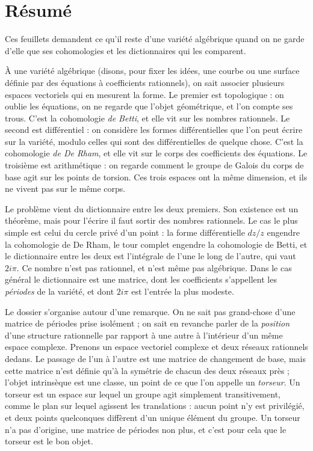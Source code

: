 \documentclass[11pt,a4paper]{article}
\begin{document}
\section*{Résumé}

\begin{resume}
Ces feuillets demandent ce qu'il reste d'une variété algébrique quand on ne
garde d'elle que ses cohomologies et les dictionnaires qui les comparent.

À une variété algébrique (disons, pour fixer les
idées, une courbe ou une surface définie par des équations à coefficients
rationnels), on sait associer plusieurs espaces vectoriels qui en mesurent la
forme. Le premier est topologique : on oublie les équations, on ne regarde que
l'objet géométrique, et l'on compte ses trous. C'est la cohomologie
\emph{de Betti}, et elle vit sur les nombres rationnels. Le second est
différentiel : on considère les formes différentielles que l'on peut écrire sur
la variété, modulo celles qui sont des différentielles de quelque chose. C'est
la cohomologie \emph{de De Rham}, et elle vit sur le corps des coefficients des
équations. Le troisième est arithmétique : on regarde comment le groupe de
Galois du corps de base agit sur les points de torsion. Ces trois espaces ont
la même dimension, et ils ne vivent pas sur le même corps.

Le problème vient du dictionnaire entre les deux premiers. Son existence est
un théorème, mais pour l'écrire il faut sortir des nombres rationnels. Le cas
le plus simple est celui du cercle privé d'un point : la forme différentielle
$dz/z$ engendre la cohomologie de De Rham, le tour complet engendre la
cohomologie de Betti, et le dictionnaire entre les deux est l'intégrale de
l'une le long de l'autre, qui vaut $2i\pi$. Ce nombre n'est pas rationnel, et
n'est même pas algébrique. Dans le cas général le dictionnaire est une matrice,
dont les coefficients s'appellent les \emph{périodes} de la variété, et dont
$2i\pi$ est l'entrée la plus modeste.

Le dossier s'organise autour d'une remarque. On ne sait pas grand-chose
d'une matrice de périodes prise isolément ; on sait en revanche parler de la
\emph{position} d'une structure rationnelle par rapport à une autre à
l'intérieur d'un même espace complexe. Prenons un espace vectoriel complexe et
deux réseaux rationnels dedans. Le passage de l'un à l'autre est une matrice de
changement de base, mais cette matrice n'est définie qu'à la symétrie de chacun
des deux réseaux près ; l'objet intrinsèque est une classe, un point de ce
que l'on appelle un \emph{torseur}. Un torseur est un espace sur lequel un
groupe agit simplement transitivement, comme le plan sur lequel agissent les
translations : aucun point n'y est privilégié, et deux points quelconques
diffèrent d'un unique élément du groupe. Un torseur n'a pas d'origine, une
matrice de périodes non plus, et c'est pour cela que le torseur est le bon
objet.


\end{resume}
\end{document}
